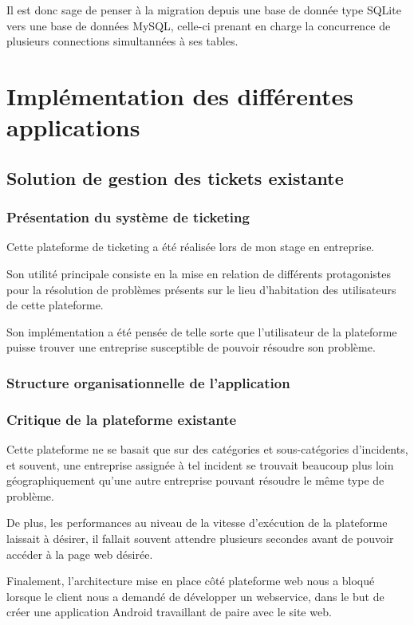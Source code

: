 \documentclass[12pt,table,a4paper]{report}
\begin{document}
Il est donc sage de penser à la migration depuis une base de donnée type SQLite vers une base de données MySQL, celle-ci prenant en charge la concurrence de plusieurs connections simultannées à ses tables.


\chapter{Implémentation des différentes applications}

\section{Solution de gestion des tickets existante}

\subsection{Présentation du système de ticketing}
Cette plateforme de ticketing a été réalisée lors de mon stage en entreprise.

Son utilité principale consiste en la mise en relation de différents protagonistes pour la résolution de problèmes présents sur le lieu d'habitation des utilisateurs de cette plateforme.

Son implémentation a été pensée de telle sorte que l'utilisateur de la plateforme puisse trouver une entreprise susceptible de pouvoir résoudre son problème.

\subsection{Structure organisationnelle de l'application}

\subsection{Critique de la plateforme existante}
Cette plateforme ne se basait que sur des catégories et sous-catégories d'incidents, et souvent, une entreprise assignée à tel incident se trouvait beaucoup plus loin géographiquement qu'une autre entreprise pouvant résoudre le même type de problème.

De plus, les performances au niveau de la vitesse d'exécution de la plateforme laissait à désirer, il fallait souvent attendre plusieurs secondes avant de pouvoir accéder à la page web désirée.

Finalement, l'architecture mise en place côté plateforme web nous a bloqué lorsque le client nous a demandé de développer un webservice, dans le but de créer une application Android travaillant de paire avec le site web.
\end{document}
